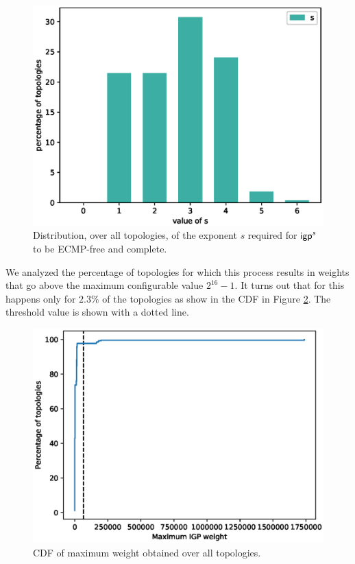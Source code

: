 \begin{figure}
\begin{center}
\includegraphics[width=.85\columnwidth]{./Network-lib/data/plot/primeIGP_s.eps}
\end{center}
\caption{Distribution, over all topologies, of the exponent $s$ required for $\mathsf{igp}^s$ to be ECMP-free and complete.}
\label{fig:primeIGP_s}
\end{figure}

We analyzed the percentage of topologies for which this process results in weights that go above the maximum configurable value $2^{16} - 1$.
It turns out that for this happens only for $2.3\%$ of the topologies as show in the CDF in Figure \ref{fig:primeIGP}. The threshold value
is shown with a dotted line.

\begin{figure}
\begin{center}
\includegraphics[width=.85\columnwidth]{./Network-lib/data/plot/primeIGP.eps}
\end{center}
\caption{CDF of maximum weight obtained over all topologies.}
\label{fig:primeIGP}
\end{figure}


